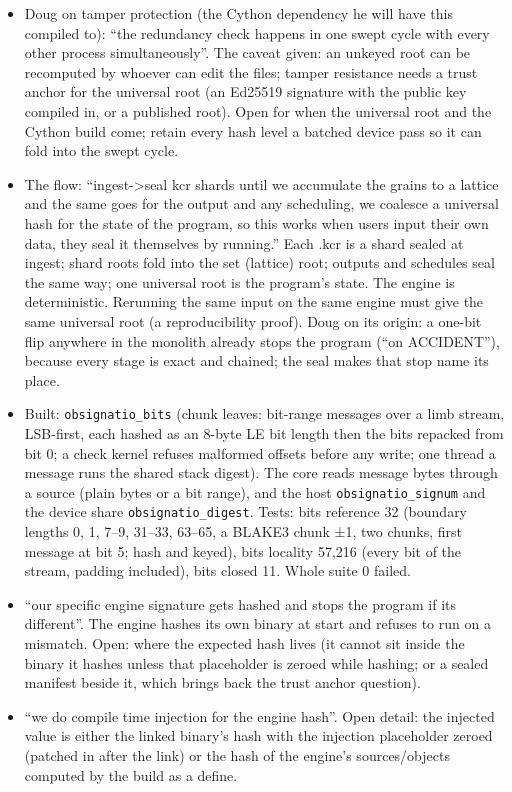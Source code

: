 \begin{itemize}
\item Doug on tamper protection (the Cython dependency he will have this compiled to): “the redundancy check happens in one swept cycle with every other process simultaneously”. The caveat given: an unkeyed root can be recomputed by whoever can edit the files; tamper resistance needs a trust anchor for the universal root (an Ed25519 signature with the public key compiled in, or a published root). Open for when the universal root and the Cython build come; retain every hash level a batched device pass so it can fold into the swept cycle.
\item The flow: “ingest->seal kcr shards until we accumulate the grains to a lattice and the same goes for the output and any scheduling, we coalesce a universal hash for the state of the program, so this works when users input their own data, they seal it themselves by running.” Each .kcr is a shard sealed at ingest; shard roots fold into the set (lattice) root; outputs and schedules seal the same way; one universal root is the program's state. The engine is deterministic. Rerunning the same input on the same engine must give the same universal root (a reproducibility proof). Doug on its origin: a one-bit flip anywhere in the monolith already stops the program (“on ACCIDENT”), because every stage is exact and chained; the seal makes that stop name its place.
\item Built: \texttt{obsignatio\_\allowbreak{}bits} (chunk leaves: bit-range messages over a limb stream, LSB-first, each hashed as an 8-byte LE bit length then the bits repacked from bit 0; a check kernel refuses malformed offsets before any write; one thread a message runs the shared stack digest). The core reads message bytes through a source (plain bytes or a bit range), and the host \texttt{obsignatio\_\allowbreak{}signum} and the device share \texttt{obsignatio\_\allowbreak{}digest}. Tests: bits reference 32 (boundary lengths 0, 1, 7–9, 31–33, 63–65, a BLAKE3 chunk ±1, two chunks, first message at bit 5; hash and keyed), bits locality 57,216 (every bit of the stream, padding included), bits closed 11. Whole suite 0 failed.
\item “our specific engine signature gets hashed and stops the program if its different”. The engine hashes its own binary at start and refuses to run on a mismatch. Open: where the expected hash lives (it cannot sit inside the binary it hashes unless that placeholder is zeroed while hashing; or a sealed manifest beside it, which brings back the trust anchor question).
\item “we do compile time injection for the engine hash”. Open detail: the injected value is either the linked binary's hash with the injection placeholder zeroed (patched in after the link) or the hash of the engine's sources/objects computed by the build as a define.

\end{itemize}
